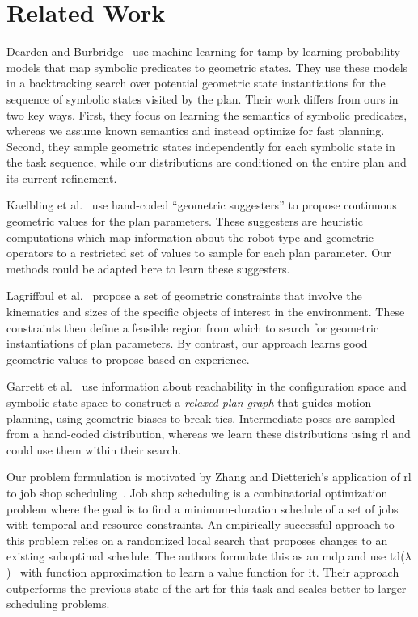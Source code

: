 \section{Related Work}
Dearden and Burbridge~\cite{deardenplanningtamp} use machine learning for {\sc tamp} by learning probability
models that map symbolic predicates to geometric states. They use these models in a backtracking search
over potential geometric state instantiations for the sequence of symbolic states visited by the plan.
Their work differs from ours in two key ways. First, they focus on learning the semantics of symbolic predicates, whereas
we assume known semantics and instead optimize for fast planning. Second, they sample geometric states independently
for each symbolic state in the task sequence, while our distributions are conditioned on the
entire plan and its current refinement.

Kaelbling et al.~\cite{kaelbling2011hierarchical} use hand-coded ``geometric suggesters'' to propose
continuous geometric values for the plan parameters. These suggesters are heuristic
computations which map information about the robot type and geometric operators to a restricted
set of values to sample for each plan parameter. Our methods could be adapted here to learn these
suggesters.

Lagriffoul et al.~\cite{lagriffoul2014orientation}
propose a set of geometric constraints that involve the kinematics and sizes of the specific objects of
interest in the environment. These constraints then define a feasible region from which to search
for geometric instantiations of plan parameters. By contrast, our approach learns good geometric values
to propose based on experience.

Garrett et al.~\cite{GarrettWAFR14} use information about reachability in the configuration
space and symbolic state space to construct a \emph{relaxed plan graph} that guides motion
planning, using geometric biases to break ties. Intermediate poses are sampled from a hand-coded
distribution, whereas we learn these distributions using {\sc rl} and could use them within their search.

Our problem formulation is motivated by Zhang and Dietterich's application of {\sc rl} to job
shop scheduling~\cite{JobShopSched}. Job shop scheduling is a combinatorial optimization problem where the goal is to find
a minimum-duration schedule of a set of jobs with temporal and resource constraints. An empirically
successful approach to this problem relies on a randomized local search that proposes changes to an
existing suboptimal schedule. The authors formulate this as an {\sc mdp} and use {\sc td}($\lambda$)~\cite{suttonbarto} with function
approximation to learn a value function for it. Their approach outperforms the previous state of the art for this task and
scales better to larger scheduling problems.

